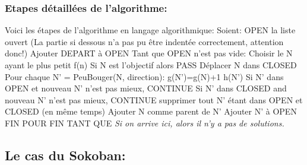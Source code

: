 \documentclass{article}
\begin{document}
\subsubsection{Etapes détaillées de l'algorithme:}
Voici les étapes de l'algorithme en langage algorithmique: \newline
Soient: OPEN la liste ouvert \newline
(La partie si dessous n'a pas pu être indentée correctement, attention donc!)
Ajouter DEPART à OPEN \newline
Tant que OPEN n'est pas vide:\newline
	Choisir le N ayant le plus petit f(n)\newline
	Si N est l'objectif alors PASS\newline
	Déplacer N dans CLOSED\newline
	Pour chaque N' = PeuBouger(N, direction):\newline
		g(N')=g(N)+1\newline
		h(N')\newline
		Si N' dans OPEN et nouveau N' n'est pas mieux, CONTINUE\newline
		Si N' dans CLOSED and nouveau N' n'est pas mieux, CONTINUE\newline
		supprimer tout N' étant dans OPEN et CLOSED (en même temps)\newline
		Ajouter N comme parent de N'\newline
		Ajouter N' à OPEN\newline
	FIN POUR\newline
FIN TANT QUE\newline
\textit{Si on arrive ici, alors il n'y a pas de solutions.}
			
\subsection{Le cas du Sokoban:}
\end{document}
